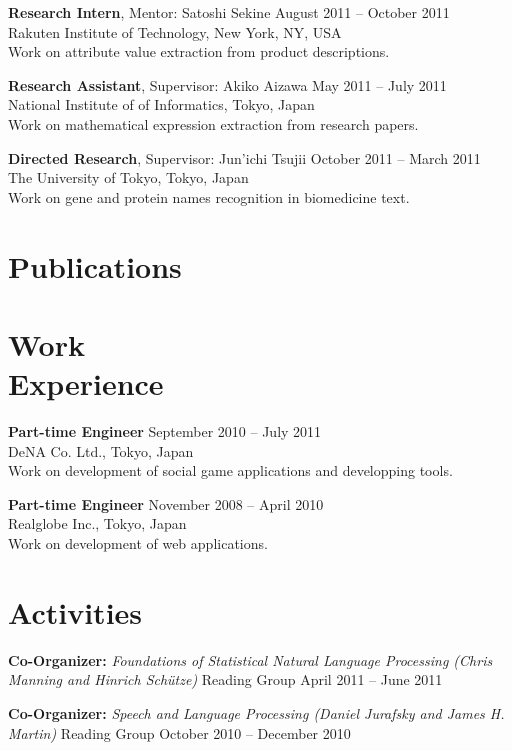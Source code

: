 \documentclass[margin]{res}
\begin{document}
\begin{resume}
\textbf{Research Intern}, Mentor: Satoshi Sekine \hfill August 2011 -- October 2011\\
Rakuten Institute of Technology, New York, NY, USA\\
Work on attribute value extraction from product descriptions. 

\textbf{Research Assistant}, Supervisor: Akiko Aizawa \hfill May 2011 -- July 2011\\
National Institute of of Informatics, Tokyo, Japan\\
Work on mathematical expression extraction from research papers.

\textbf{Directed Research}, Supervisor: Jun'ichi Tsujii \hfill October 2011 -- March 2011\\
The University of Tokyo, Tokyo, Japan\\
Work on gene and protein names recognition in biomedicine text.\\

\section{Publications}
\renewcommand\refname{}
\nocite{Usami2012, Usami2011-rrds, Usami2011-BioNLP, Usami2011-SIGNL, Usami2011}



\section{Work \\ Experience}
\textbf{Part-time Engineer} \hfill September 2010 -- July 2011\\
DeNA Co. Ltd., Tokyo, Japan\\
Work on development of social game applications and developping tools.

\textbf{Part-time Engineer} \hfill November 2008 -- April 2010\\
Realglobe Inc., Tokyo, Japan\\
Work on development of web applications.\\

\section{Activities}
\textbf{Co-Organizer:} {\sl Foundations of Statistical Natural Language Processing (Chris Manning and Hinrich Sch\"{u}tze)} Reading Group \hfill April 2011 -- June 2011

\textbf{Co-Organizer:} {\sl Speech and Language Processing (Daniel Jurafsky and James H. Martin)} Reading Group \hfill October 2010 -- December 2010\\


\end{resume}
\end{document}
